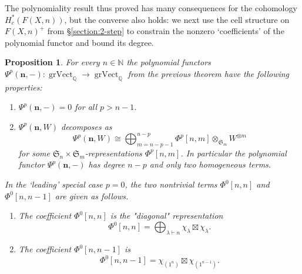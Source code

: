 \documentclass[12pt]{article}
\newcounter{continue-counter}
\newcommand{\N}{\mathbb{N}}
\newcommand{\Q}{\mathbb{Q}}
\newcommand{\SymGroup}[1][n]{\mathfrak{S}_{#1}}
\newcommand{\Specht}[1]{\chi_{#1}}
\newcommand{\TransposePartition}[1]{{#1}^{\ast}}
\newcommand{\n}[1][n]{\mathbf{#1}}
\DeclareMathOperator{\GradedVect}{grVect}
\theoremstyle{plain}
\newtheorem{prop}[thm]{Proposition}
\theoremstyle{definition}
\theoremstyle{remark}
\begin{document}
The polynomiality result thus proved has many consequences for the cohomology $H^*_c(F(X,n))$, but the converse also holds: we next use the cell structure on $F(X,n)^+$ from \S\ref{section:2-step} to constrain the nonzero `coefficients' of the polynomial functor and bound its degree.

\begin{prop}\label{prop:vanishing coefficients}
    For every $n\in \N$ the polynomial functors $\Psi^p(\n,-)\colon \GradedVect_{\Q}\to\GradedVect_{\Q}$ from the previous theorem have the following properties:
    \begin{enumerate}
        \item $\Psi^p(\n,-) = 0$ for all $p > n-1$.
        \item $\Psi^p(\n,W)$ decomposes as
        \[
            \Psi^p(\n,W) \cong \bigoplus_{m=n-p-1}^{n-p} \Phi^p[n,m]\otimes_{\SymGroup[m]} W^{\otimes m}
        \]
        for some $\SymGroup[n]\times\SymGroup[m]$-representations $\Phi^p[n,m]$. In particular the polynomial functor $\Psi^p(\n,-)$ has degree $n-p$ and only two homogeneous terms.
        
    \setcounter{continue-counter}{\value{enumi}}
\end{enumerate}
In the `leading' special case $p=0$, the two nontrivial terms $\Phi^0[n,n]$ and $\Phi^0[n,n-1]$ are given as follows.
\begin{enumerate}
\setcounter{enumi}{\value{continue-counter}}
        \item The coefficient $\Phi^0[n,n]$ is the "diagonal" representation
        \[
            \Phi^0[n,n] = \bigoplus_{\lambda\vdash n}{\Specht{\lambda}\boxtimes\Specht{\lambda}}.
        \]
        \item The coefficient $\Phi^0[n,n-1]$ is
        \[
            \Phi^0[n,n-1] = \Specht{(1^n)}\boxtimes\Specht{(1^{n-1})}.%
        \]
    \end{enumerate}
\end{prop}
\end{document}
